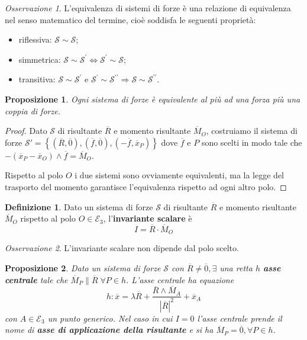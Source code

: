 \documentclass{book}
\theoremstyle{plain}
\theoremstyle{plain}
\theoremstyle{plain}
\theoremstyle{plain}
\theoremstyle{plain}
\newtheorem{prop}{Proposizione}[chapter]
\theoremstyle{definition}
\newtheorem{defi}{Definizione}[chapter]
\theoremstyle{remark}
\newtheorem*{oss}{Osservazione}
\theoremstyle{definition}
\begin{document}
\begin{oss}
    L'equivalenza di sistemi di forze è una relazione di equivalenza nel senso matematico del termine, cioè soddisfa le seguenti proprietà:
    \begin{itemize}
        \item riflessiva: $\mathcal{S} \sim \mathcal{S}$;
        \item simmetrica: $\mathcal{S} \sim \mathcal{S}^{\prime} \iff \mathcal{S}^{\prime} \sim \mathcal{S}$;
        \item transitiva: $\mathcal{S} \sim \mathcal{S}^{\prime}$ e $\mathcal{S}^{\prime} \sim \mathcal{S}^{\prime \prime} \Longrightarrow \mathcal{S} \sim \mathcal{S}^{\prime \prime}$.
    \end{itemize}
\end{oss}

\begin{prop}
    Ogni sistema di forze è equivalente al più ad una forza più una coppia di forze.
\end{prop}

\begin{proof}
    Dato $\mathcal{S}$ di risultante $\overline{R}$ e momento risultante $\overline{M}_O$, costruiamo il sistema di forze $\mathcal{S}'=\left\{(\overline{R},\overline{0}), (\overline{f},\overline{0}),(-\overline{f},\overline{x}_P)\right\}$ dove $\overline{f}$ e $P$ sono scelti in modo tale che $-(\overline{x}_P-\overline{x}_O)\wedge\overline{f}=\overline{M}_O$.

    \noindent Rispetto al polo $O$ i due sistemi sono ovviamente equivalenti, ma la legge del trasporto del momento garantisce l'equivalenza rispetto ad ogni altro polo.
\end{proof}

\begin{defi}
    Dato un sistema di forze $\mathcal{S}$ di risultante $\overline{R}$ e momento risultante $\overline{M}_O$ rispetto al polo $O \in \mathcal{E}_3$, l'\textbf{invariante scalare} è
    \begin{displaymath}
        \boxed{
        I=\overline{R} \cdot \overline{M}_{O}
        }
    \end{displaymath}
\end{defi}

\begin{oss}
    L'invariante scalare non dipende dal polo scelto.
\end{oss}

\begin{prop}
    Dato un sistema di forze $\mathcal{S}$ con $\overline{R} \neq \overline{0}, \exists$ una retta $h$ \textbf{asse centrale} tale che $\overline{M}_{P} \parallel \overline{R} \; \forall P \in h$. L'asse centrale ha equazione
    \begin{displaymath}
        h: \overline{x}=\lambda \overline{R}+\frac{\overline{R} \wedge \overline{M}_{A}}{|\overline{R}|^{2}}+\overline{x}_{A}
    \end{displaymath}
    con $A \in \mathcal{E}_{3}$ un punto generico. Nel caso in cui $I=0$ l'asse centrale prende il nome di \textbf{asse di applicazione della risultante} e si ha $\overline{M}_{P}=\overline{0}, \forall P \in h$.
\end{prop}
\end{document}
